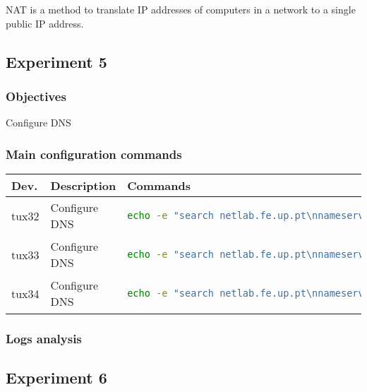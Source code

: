 \documentclass[a4paper, 11pt]{report}
\begin{document}
NAT is a method to translate IP addresses of computers in a network to a single public IP address.

\subsection{Experiment 5} \label{sec:Exp5}
\subsubsection{Objectives} \label{sec:Obj5}
Configure DNS
\subsubsection{Main configuration commands} \label{sec:Com5}
\begin{tabular}{l | p{26mm} | l}
    \textbf{Dev.} & \textbf{Description}                                  & \textbf{Commands}                       \\ \hline
    tux32      & Configure DNS                           & 
    \begin{lstlisting}[frame=none, numbers=none, language=sh]
echo -e "search netlab.fe.up.pt\nnameserver 172.16.1.1" > /etc/resolv.conf
    \end{lstlisting}                     \\ \hline
    tux33  &  Configure DNS                                    &
    \begin{lstlisting}[frame=none, numbers=none, language=sh]
echo -e "search netlab.fe.up.pt\nnameserver 172.16.1.1" > /etc/resolv.conf
    \end{lstlisting}                 \\ \hline
    tux34        &  Configure DNS                                   &
    \begin{lstlisting}[frame=none, numbers=none, language=sh]
echo -e "search netlab.fe.up.pt\nnameserver 172.16.1.1" > /etc/resolv.conf
    \end{lstlisting} \\
\end{tabular}
\subsubsection{Logs analysis} \label{sec:Log5}

\subsection{Experiment 6} \label{sec:Exp6}
\end{document}
